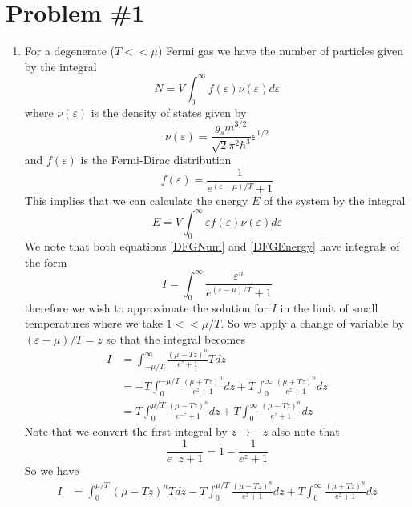 \documentclass[11pt]{article}
\numberwithin{equation}{section}
\begin{document}


\section{Problem \#1}
\begin{enumerate}[(1)]
\item For a degenerate ($T<<\mu$) Fermi gas we have the number of particles given by the 
integral
\begin{equation}
N = V\int_{0}^{\infty}f(\varepsilon)\nu(\varepsilon)d\varepsilon
\label{DFGNum}
\end{equation}
where $\nu(\varepsilon)$ is the density of states given by
\begin{equation}
\nu(\varepsilon) = \frac{g_sm^{3/2}}{\sqrt{2}\pi^2\hbar^3}\varepsilon^{1/2}
\label{DenOStates}
\end{equation}
and $f(\varepsilon)$ is the Fermi-Dirac distribution
\begin{equation}
f(\varepsilon) = \frac{1}{e^{(\varepsilon-\mu)/T}+1}
\label{FDDist}
\end{equation}
This implies that we can calculate the energy $E$ of the system by the integral
\begin{equation}
E = V\int_{0}^{\infty}{\varepsilon}f(\varepsilon)\nu(\varepsilon)d\varepsilon
\label{DFGEnergy}
\end{equation}
We note that both equations \ref{DFGNum} and \ref{DFGEnergy} have integrals of the form
$$I = \int_{0}^{\infty}\frac{\varepsilon^n}{e^{(\varepsilon-\mu)/T}+1}$$
therefore we wish to approximate the solution for $I$ in the limit of small temperatures 
where we take $1<<\mu/T$. So we apply a change of variable by $(\varepsilon-\mu)/T=z$ so that
the integral becomes
\begin{align*}
I &= \int_{-\mu/T}^{\infty}\frac{(\mu+Tz)^{n}}{e^{z}+1}Tdz\\
&= -T\int_{0}^{-\mu/T}\frac{(\mu+Tz)^{n}}{e^{z}+1}dz + T\int_{0}^{\infty}\frac{(\mu+Tz)^{n}}{e^{z}+1}dz\\
&= T\int_{0}^{\mu/T}\frac{(\mu-Tz)^{n}}{e^{-z}+1}dz + T\int_{0}^{\infty}\frac{(\mu+Tz)^{n}}{e^{z}+1}dz
\end{align*}
Note that we convert the first integral by $z\rightarrow-z$ also note that
$$\frac{1}{e^-z+1} = 1 - \frac{1}{e^z+1}$$
So we have
\begin{align*}
I &= \int_{0}^{\mu/T}(\mu-Tz)^{n}Tdz - T\int_{0}^{\mu/T}\frac{(\mu-Tz)^{n}}{e^{z}+1}dz  + T\int_{0}^{\infty}\frac{(\mu+Tz)^{n}}{e^{z}+1}dz\\

\end{align*}
\end{enumerate}
\end{document}
